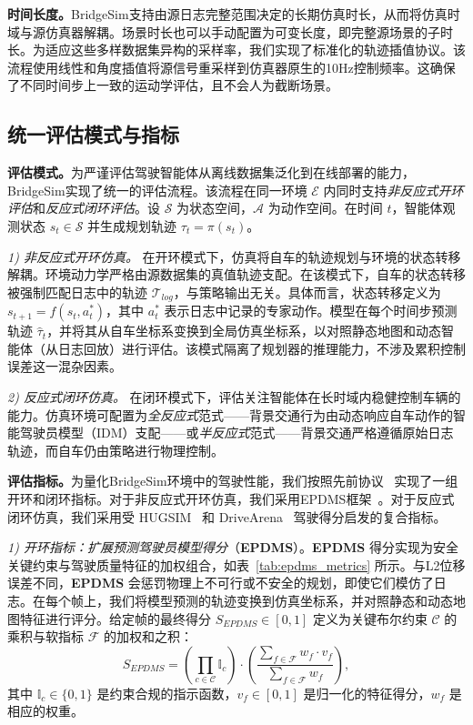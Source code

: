 \documentclass{article}
\begin{document}
\textbf{时间长度。}BridgeSim支持由源日志完整范围决定的长期仿真时长，从而将仿真时域与源仿真器解耦。场景时长也可以手动配置为可变长度，即完整源场景的子时长。为适应这些多样数据集异构的采样率，我们实现了标准化的轨迹插值协议。该流程使用线性和角度插值将源信号重采样到仿真器原生的10Hz控制频率。这确保了不同时间步上一致的运动学评估，且不会人为截断场景。

\subsection{统一评估模式与指标}
\label{appendix:eval_metrics}
\textbf{评估模式。}为严谨评估驾驶智能体从离线数据集泛化到在线部署的能力，BridgeSim实现了统一的评估流程。该流程在同一环境 $\mathcal{E}$ 内同时支持\textit{非反应式开环评估}和\textit{反应式闭环评估}。设 $\mathcal{S}$ 为状态空间，$\mathcal{A}$ 为动作空间。在时间 $t$，智能体观测状态 $s_t \in \mathcal{S}$ 并生成规划轨迹 $\tau_t = \pi(s_t)$。

\textit{1) 非反应式开环仿真。 }在开环模式下，仿真将自车的轨迹规划与环境的状态转移解耦。环境动力学严格由源数据集的真值轨迹支配。在该模式下，自车的状态转移被强制匹配日志中的轨迹 $\mathcal{T}_{log}$，与策略输出无关。具体而言，状态转移定义为 $s_{t+1} = f(s_t, a^*_{t})$，其中 $a^*_t$ 表示日志中记录的专家动作。模型在每个时间步预测轨迹 $\hat{\tau}_t$，并将其从自车坐标系变换到全局仿真坐标系，以对照静态地图和动态智能体（从日志回放）进行评估。该模式隔离了规划器的推理能力，不涉及累积控制误差这一混杂因素。

\textit{2) 反应式闭环仿真。 }在闭环模式下，评估关注智能体在长时域内稳健控制车辆的能力。仿真环境可配置为\textit{全反应式}范式——背景交通行为由动态响应自车动作的智能驾驶员模型（IDM）支配——或\textit{半反应式}范式——背景交通严格遵循原始日志轨迹，而自车仍由策略进行物理控制。

\textbf{评估指标。}为量化BridgeSim环境中的驾驶性能，我们按照先前协议~\cite{navsimv1, navsimv2, zhou2024hugsim, yang2024drivearena, li2025hydra-mdp++} 实现了一组开环和闭环指标。对于非反应式开环仿真，我们采用EPDMS框架~\cite{navsimv1, navsimv2, li2025hydra-mdp++}。对于反应式闭环仿真，我们采用受 HUGSIM~\cite{zhou2024hugsim} 和 DriveArena~\cite{yang2024drivearena} 驾驶得分启发的复合指标。

\textit{1) 开环指标：扩展预测驾驶员模型得分}（\textbf{EPDMS}）。\textbf{EPDMS} 得分实现为安全关键约束与驾驶质量特征的加权组合，如表~\ref{tab:epdms_metrics} 所示。与L2位移误差不同，\textbf{EPDMS} 会惩罚物理上不可行或不安全的规划，即使它们模仿了日志。在每个帧上，我们将模型预测的轨迹变换到仿真坐标系，并对照静态和动态地图特征进行评分。给定帧的最终得分 $S_{EPDMS} \in [0, 1]$ 定义为关键布尔约束 $\mathcal{C}$ 的乘积与软指标 $\mathcal{F}$ 的加权和之积：
\begin{equation}
    S_{EPDMS} = \left( \prod_{c \in \mathcal{C}} \mathbb{I}_c \right) \cdot \left( \frac{\sum_{f \in \mathcal{F}} w_f \cdot v_f}{\sum_{f \in \mathcal{F}} w_f} \right),
\end{equation}
其中 $\mathbb{I}_c \in \{0, 1\}$ 是约束合规的指示函数，$v_f \in [0, 1]$ 是归一化的特征得分，$w_f$ 是相应的权重。
\end{document}
